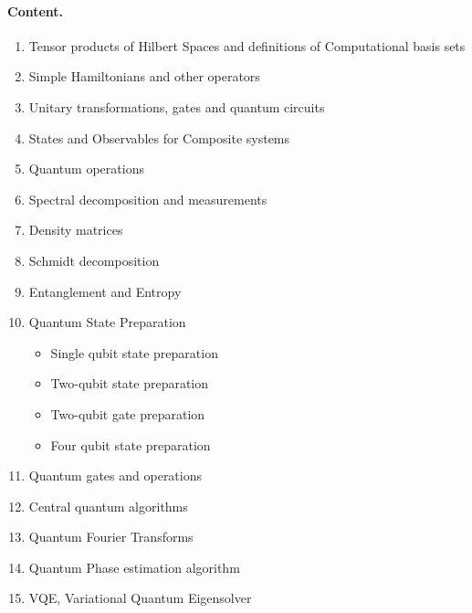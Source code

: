\documentclass[%
oneside,                 %
final,                   %
10pt]{article}
\begin{document}
\paragraph{Content.}
\begin{enumerate}
\item Tensor products of Hilbert Spaces and definitions of Computational basis sets

\item Simple Hamiltonians and other operators

\item Unitary transformations, gates and quantum circuits

\item States and Observables for Composite systems

\item Quantum operations

\item Spectral decomposition and measurements

\item Density matrices

\item Schmidt decomposition

\item Entanglement and Entropy

\item Quantum State Preparation
\begin{itemize}

  \item Single qubit state preparation

  \item Two-qubit state preparation

  \item Two-qubit gate preparation

  \item Four qubit state preparation

\end{itemize}

\noindent
\item Quantum gates and operations

\item Central quantum algorithms

\item Quantum Fourier Transforms

\item Quantum Phase estimation algorithm

\item VQE, Variational Quantum Eigensolver


\end{enumerate}
\end{document}
